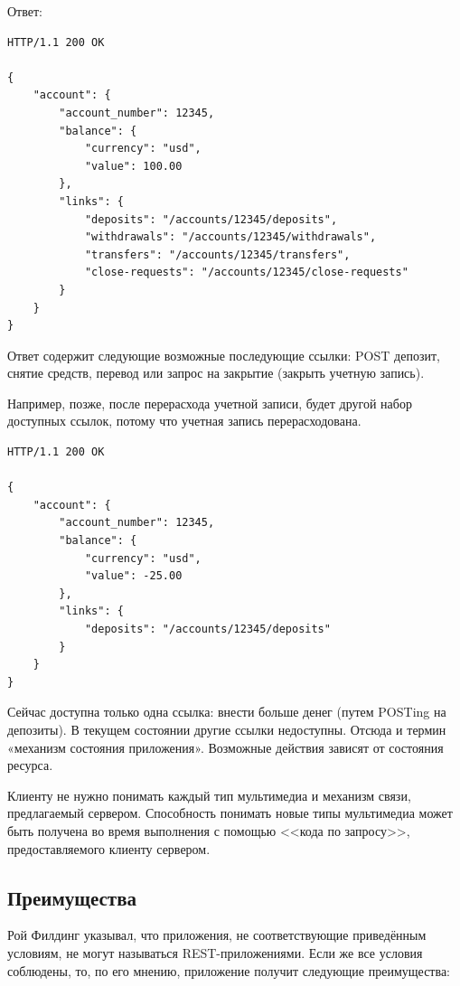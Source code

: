 \documentclass[a4page]{article}
\begin{document}
Ответ:

\begin{lstlisting}
HTTP/1.1 200 OK

{
    "account": {
        "account_number": 12345,
        "balance": {
            "currency": "usd",
            "value": 100.00
        },
        "links": {
            "deposits": "/accounts/12345/deposits",
            "withdrawals": "/accounts/12345/withdrawals",
            "transfers": "/accounts/12345/transfers",
            "close-requests": "/accounts/12345/close-requests"
        }
    }
}
\end{lstlisting}

Ответ содержит следующие возможные последующие ссылки:
POST депозит, снятие средств, перевод или запрос на закрытие (закрыть учетную запись).

Например, позже, после перерасхода учетной записи,
будет другой набор доступных ссылок, потому что учетная запись перерасходована.

\begin{lstlisting}
HTTP/1.1 200 OK

{
    "account": {
        "account_number": 12345,
        "balance": {
            "currency": "usd",
            "value": -25.00
        },
        "links": {
            "deposits": "/accounts/12345/deposits"
        }
    }
}
\end{lstlisting}

Сейчас доступна только одна ссылка: внести больше денег (путем POSTing на депозиты).
В текущем состоянии другие ссылки недоступны.
Отсюда и термин «механизм состояния приложения». Возможные действия зависят от состояния ресурса.

Клиенту не нужно понимать каждый тип мультимедиа и механизм связи, предлагаемый сервером.
Способность понимать новые типы мультимедиа может быть получена во время выполнения
с помощью <<кода по запросу>>, предоставляемого клиенту сервером.

\subsection{Преимущества}
Рой Филдинг указывал, что приложения, не соответствующие приведённым условиям,
не могут называться REST-приложениями. Если же все условия соблюдены, то, по его мнению,
приложение получит следующие преимущества:
\end{document}

